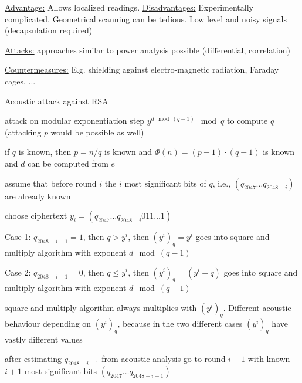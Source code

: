 \documentclass[landscape, a4paper]{article}
\begin{document}
\begin{minipage}[t]{0.2\linewidth}
\begin{betterlist}
		\item \underline{Advantage:} Allows localized readings. \underline{Disadvantages:} Experimentally complicated. Geometrical scanning can be tedious. Low level and noisy signals (decapsulation required)
		\item \underline{Attacks:} approaches similar to power analysis possible (differential, correlation)
		\item \underline{Countermeasures:} E.g. shielding against electro-magnetic radiation, Faraday cages, ...
	\end{betterlist}
	\begin{betterlist}
		\item \alert{Acoustic attack against RSA}
		\begin{betterlist}
			\item attack on modular exponentiation step $y^{d \mod (q−1)} \mod q$ to compute $q$ (attacking $p$ would be possible as well)
			\item if $q$ is known, then $p = n/q$ is known and $\Phi(n)= (p − 1) \cdot (q − 1)$ is known and $d$ can be computed from $e$
			\item assume that before round $i$ the $i$ most significant bits of $q$, i.e., $(q_{2047} \ldots q_{2048−i})$ are already known
			\item choose ciphertext $y_i = (q_{2047} \ldots q_{2048−i} 011 \ldots 1)$
			\item \alert{Case 1:} $q_{2048−i−1} = 1$, then $q > y^i$, then $(y^i)_q=y^i$ goes into square and multiply algorithm with exponent $d \mod (q − 1)$
			\item \alert{Case 2:} $q_{2048−i−1} = 0$, then $q \le y^i$, then $(y^i)_q=(y^i - q)$ goes into square and multiply algorithm with exponent $d \mod (q − 1)$
			\item square and multiply algorithm always multiplies with $(y^i)_q$. Different acoustic behaviour depending on $(y^i)_q$, because in the two different cases $(y^i)_q$ have vastly different values
			\item after estimating $q_{2048−i−1}$ from acoustic analysis go to round $i + 1$ with known $i + 1$ most significant bits $(q_{2047} \ldots q_{2048−i−1})$


\end{betterlist}
\end{betterlist}
\end{minipage}
\end{document}
